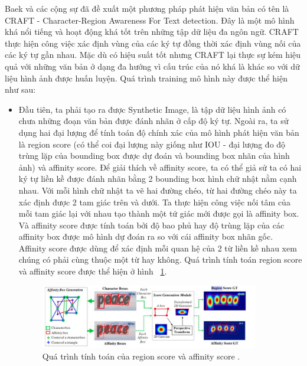 Baek và các cộng sự \cite{baek2019character} đã đề xuất một phương pháp phát hiện văn bản có tên là CRAFT -
Character-Region Awareness For Text detection. Đây là một mô hình khá nổi tiếng và hoạt
động khá tốt trên những tập dữ liệu đa ngôn ngữ. CRAFT thực hiện công việc xác định vùng
của các ký tự đồng thời xác định vùng nối của các ký tự gần nhau. Mặc dù có hiệu suất tốt
nhưng CRAFT lại thực sự kém hiệu quả với những văn bản ở dạng đa hướng vì cấu trúc
của nó khá là khác so với dữ liệu hình ảnh được huấn luyện. Quá trình training mô hình này
được thể hiện như sau:
\begin{itemize}
    \item Đầu tiên, ta phải tạo ra được Synthetic Image, là tập dữ liệu hình ảnh có chưa
những đoạn văn bản được đánh nhãn ở cấp độ ký tự. Ngoài ra, ta sử dụng hai đại
lượng để tính toán độ chính xác của mô hình phát hiện văn bản là region score (có
thể coi đại lượng này giống như IOU - đại lượng đo độ trùng lặp của bounding box
được dự đoán và bounding box nhãn của hình ảnh) và affinity score. Để giải thích về
affinity score, ta có thể giả sử ta có hai ký tự liền kề được đánh nhãn bằng 2
bounding box hình chữ nhật nằm cạnh nhau. Với mỗi hình chữ nhật ta vẽ hai đường chéo, từ hai đường chéo này ta xác định được 2 tam giác trên và dưới. Ta thực hiện
công việc nối tâm của mỗi tam giác lại với nhau tạo thành một tứ giác mới được gọi
là affinity box. Và affinity score được tính toán bởi độ bao phủ hay độ trùng lặp của
các affinity box được mô hình dự đoán ra so với cái affinity box nhãn gốc. Affinity
score được dùng để xác định mỗi quan hệ của 2 từ liền kề nhau xem chúng có phải
cùng thuộc một từ hay không. Quá trình tính toán region score và affinity score được thể hiện ở hình ~\ref{fig_2.6}.

\begin{figure}
\centering
\includegraphics[width=0.9\textwidth]{mep_img/Capture3.JPG}
\caption{Quá trình tính toán của region score và affinity score \cite{baek2019character}. }\label{fig_2.6}
\end{figure}


\end{itemize}
